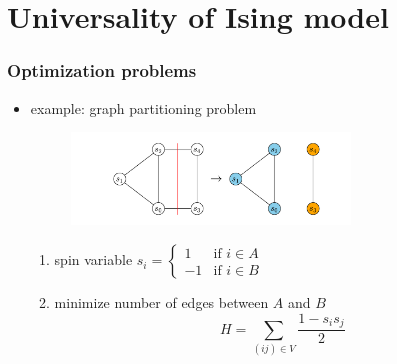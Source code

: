 \documentclass[11pt]{beamer}
\newcommand{\itemb}{\item[$\bullet$]}
\begin{document}
\section{Universality of Ising model}

\begin{frame}
    \frametitle{Optimization problems}
    \begin{itemize}
        \setlength{\itemindent}{-1em}
        \itemb example: graph partitioning problem
        \begin{figure}[!htb]
            \centering
            \includegraphics[width=0.7\textwidth]{../plots/max_cut_instance.pdf}
            \label{fig:graph_partitioning}
        \end{figure}
        \begin{enumerate}
            \setlength{\itemindent}{-2em}
            \item spin variable
            $
            s_i = \begin{cases}
                1 & \text{if } i \in A \\
                -1 & \text{if } i \in B
            \end{cases}
            $
            \vspace*{0.2cm}
            \item minimize number of edges between $A$ and $B$
            $$H = \sum_{(ij) \in V} \frac{1 - s_i s_j}{2}$$
        \end{enumerate}
    \end{itemize}
\end{frame}
\end{document}
